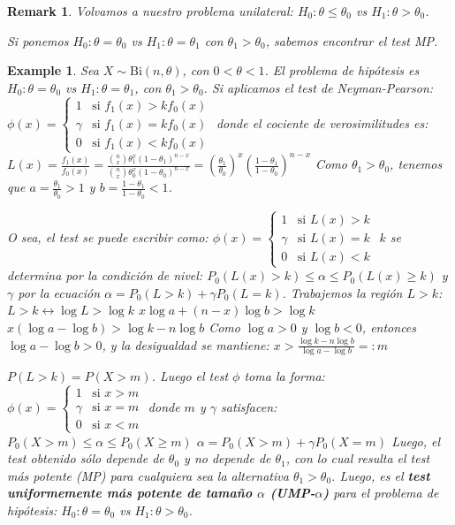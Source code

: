 \documentclass{article}
\theoremstyle{remarkstyle}
\newtheorem*{remark}{Remark}
\theoremstyle{examplestyle}
\newtheorem*{example}{Example}
\theoremstyle{definitionstyle}
\theoremstyle{lemmastyle}
\theoremstyle{theoremstyle}
\begin{document}
\begin{remark}
Volvamos a nuestro problema unilateral:
$H_0: \theta \le \theta_0$ vs $H_1: \theta > \theta_0$.

Si ponemos
$H_0: \theta = \theta_0$ vs $H_1: \theta = \theta_1$
con $\theta_1 > \theta_0$, sabemos encontrar el test MP.
\end{remark}

\begin{example}
Sea $X \sim \text{Bi}(n, \theta)$, con $0 < \theta < 1$.
El problema de hipótesis es
$H_0: \theta = \theta_0$ vs $H_1: \theta = \theta_1$, con $\theta_1 > \theta_0$.
Si aplicamos el test de Neyman-Pearson:
$\phi(x) = \begin{cases} 1 & \text{si } f_1(x) > k f_0(x) \\ \gamma & \text{si } f_1(x) = k f_0(x) \\ 0 & \text{si } f_1(x) < k f_0(x) \end{cases}$
donde el cociente de verosimilitudes es:
$L(x) = \frac{f_1(x)}{f_0(x)} = \frac{\binom{n}{x} \theta_1^x (1-\theta_1)^{n-x}}{\binom{n}{x} \theta_0^x (1-\theta_0)^{n-x}} = \left(\frac{\theta_1}{\theta_0}\right)^x \left(\frac{1-\theta_1}{1-\theta_0}\right)^{n-x}$
Como $\theta_1 > \theta_0$, tenemos que $a = \frac{\theta_1}{\theta_0} > 1$ y $b = \frac{1-\theta_1}{1-\theta_0} < 1$.

O sea, el test se puede escribir como:
$\phi(x) = \begin{cases} 1 & \text{si } L(x) > k \\ \gamma & \text{si } L(x) = k \\ 0 & \text{si } L(x) < k \end{cases}$
$k$ se determina por la condición de nivel:
$P_0(L(x) > k) \le \alpha \le P_0(L(x) \ge k)$
y $\gamma$ por la ecuación
$\alpha = P_0(L > k) + \gamma P_0(L=k)$.
Trabajemos la región $L > k$:
$L > k \leftrightarrow \log L > \log k$
$x \log a + (n-x) \log b > \log k$
$x(\log a - \log b) > \log k - n \log b$
Como $\log a > 0$ y $\log b < 0$, entonces $\log a - \log b > 0$, y la desigualdad se mantiene:
$x > \frac{\log k - n \log b}{\log a - \log b} =: m$

$P(L > k) = P(X > m)$. Luego el test $\phi$ toma la forma:
$\phi(x) = \begin{cases} 1 & \text{si } x > m \\ \gamma & \text{si } x = m \\ 0 & \text{si } x < m \end{cases}$
donde $m$ y $\gamma$ satisfacen:
$P_0(X > m) \le \alpha \le P_0(X \ge m)$
$\alpha = P_0(X > m) + \gamma P_0(X=m)$
Luego, el test obtenido sólo depende de $\theta_0$ y no depende de $\theta_1$, con lo cual resulta el test más potente (MP) para cualquiera sea la alternativa $\theta_1 > \theta_0$. Luego, es el \textbf{test uniformemente más potente de tamaño $\alpha$ (UMP-$\alpha$)} para el problema de hipótesis:
$H_0: \theta = \theta_0$ vs $H_1: \theta > \theta_0$.
\end{example}
\end{document}
